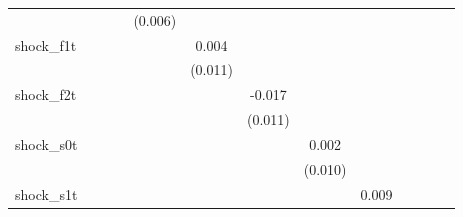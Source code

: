 {\begin{tabular}{l*{12}{c}}
            &                     &                     &                     &     (0.006)         &                     &                     &                     &                     &                     &                     &                     &                     \\
\addlinespace
shock\_f1t   &                     &                     &                     &                     &       0.004         &                     &                     &                     &                     &                     &                     &                     \\
            &                     &                     &                     &                     &     (0.011)         &                     &                     &                     &                     &                     &                     &                     \\
\addlinespace
shock\_f2t   &                     &                     &                     &                     &                     &      -0.017         &                     &                     &                     &                     &                     &                     \\
            &                     &                     &                     &                     &                     &     (0.011)         &                     &                     &                     &                     &                     &                     \\
\addlinespace
shock\_s0t   &                     &                     &                     &                     &                     &                     &       0.002         &                     &                     &                     &                     &                     \\
            &                     &                     &                     &                     &                     &                     &     (0.010)         &                     &                     &                     &                     &                     \\
\addlinespace
shock\_s1t   &                     &                     &                     &                     &                     &                     &                     &       0.009         &                     &                     &                     &                     \\

\end{tabular}}

